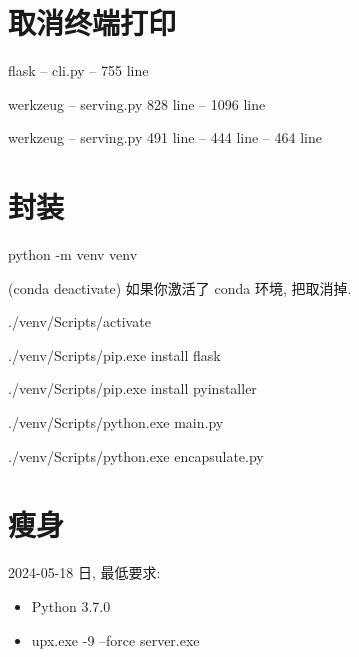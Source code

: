 \documentclass{article}
\begin{document}
\section{取消终端打印}

flask -- cli.py -- 755 line

werkzeug -- serving.py 828 line -- 1096 line

werkzeug -- serving.py 491 line -- 444 line -- 464 line


\section{封装}

python -m venv venv

(conda deactivate) 如果你激活了 conda 环境, 把取消掉.

./venv/Scripts/activate

./venv/Scripts/pip.exe install flask

./venv/Scripts/pip.exe install pyinstaller

./venv/Scripts/python.exe main.py

./venv/Scripts/python.exe encapsulate.py



\section{瘦身}

2024-05-18 日, 最低要求:

\begin{itemize}
    \item Python 3.7.0
    \item upx.exe -9 --force server.exe
\end{itemize}
\end{document}
